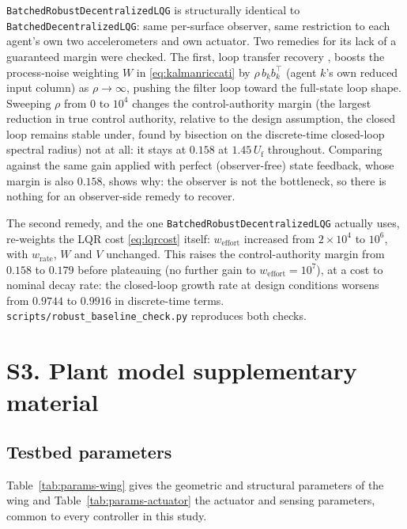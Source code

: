 \documentclass[11pt]{article}
\newcommand{\Uf}{U_{\mathrm{f}}}
\begin{document}
\texttt{BatchedRobustDecentralizedLQG} is structurally identical to
\texttt{BatchedDecentralizedLQG}: same per-surface observer, same
restriction to each agent's own two accelerometers and own actuator. Two
remedies for its lack of a guaranteed margin \citep{doyle1978guaranteed}
were checked. The first, loop transfer recovery \citep{doylestein1981ltr},
boosts the process-noise weighting $W$ in \eqref{eq:kalmanriccati} by
$\rho\, b_k b_k^{\top}$ (agent $k$'s own reduced input column) as
$\rho\to\infty$, pushing the filter loop toward the full-state loop shape.
Sweeping $\rho$ from $0$ to $10^4$ changes the control-authority margin
(the largest reduction in true control authority, relative to the design
assumption, the closed loop remains stable under, found by bisection on
the discrete-time closed-loop spectral radius) not at all: it stays at
$0.158$ at $1.45\,\Uf$ throughout. Comparing against the same gain applied
with perfect (observer-free) state feedback, whose margin is also $0.158$,
shows why: the observer is not the bottleneck, so there is nothing for an
observer-side remedy to recover.

The second remedy, and the one \texttt{BatchedRobustDecentralizedLQG}
actually uses, re-weights the LQR cost \eqref{eq:lqrcost} itself:
$w_{\mathrm{effort}}$ increased from $2\times10^4$ to $10^6$, with
$w_{\mathrm{rate}}$, $W$ and $V$ unchanged. This raises the
control-authority margin from $0.158$ to $0.179$ before plateauing (no
further gain to $w_{\mathrm{effort}}=10^{7}$), at a cost to nominal decay
rate: the closed-loop growth rate at design conditions worsens from
$0.9744$ to $0.9916$ in discrete-time terms.
\texttt{scripts/robust\_baseline\_check.py} reproduces both checks.

\section*{S3. Plant model supplementary material}
\label{sec:s3}

\subsection*{Testbed parameters}

Table~\ref{tab:params-wing} gives the geometric and structural parameters
of the wing and Table~\ref{tab:params-actuator} the actuator and sensing
parameters, common to every controller in this study.
\end{document}
